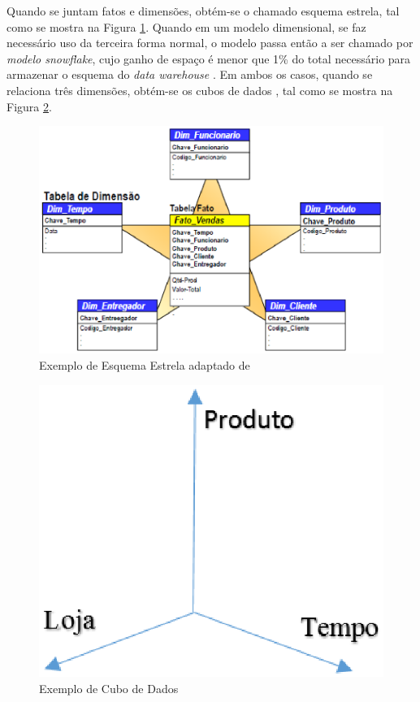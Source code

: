Quando se juntam fatos e dimensões, obtém-se o chamado esquema estrela, tal como se mostra na Figura \ref{estrela}. Quando em um modelo dimensional, se faz necessário uso da terceira forma normal, o modelo passa então a ser chamado por \textit{modelo snowflake}, cujo ganho de espaço é menor que 1\% do total necessário para armazenar o esquema do \textit{data warehouse} . Em ambos os casos, quando se relaciona três dimensões, obtém-se os cubos de dados \cite{Kimball2002}, tal como se mostra na Figura \ref{cube}.


\begin{figure}[ht!]
\centering
\includegraphics[keepaspectratio=true,scale=0.2]{figuras/star_schema.eps}
\caption{Exemplo de Esquema Estrela adaptado de }
\label{estrela}
\end{figure}
\FloatBarrier


\begin{figure}[h!]
\centering
\includegraphics[keepaspectratio=false,scale=0.85]{figuras/cube.eps}
\caption{Exemplo de Cubo de Dados}
\label{cube}
\end{figure}
\FloatBarrier


